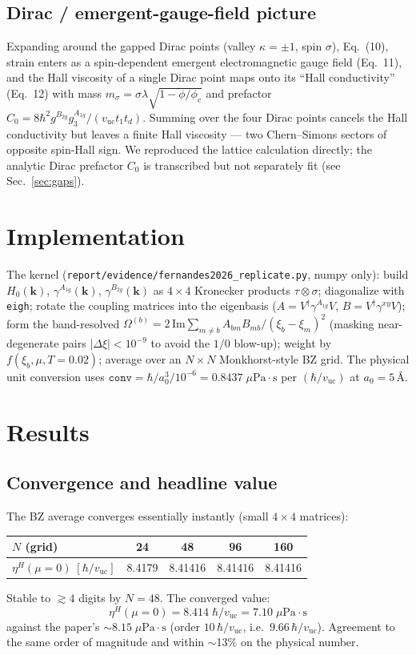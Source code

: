 \documentclass[11pt,a4paper]{article}
\newcommand{\vuc}{v_{\mathrm{uc}}}
\newcommand{\etaH}{\eta^{H}}
\begin{document}
\subsection{Dirac / emergent-gauge-field picture}
Expanding around the gapped Dirac points (valley $\kappa=\pm1$, spin
$\sigma$), Eq.~(10), strain enters as a spin-dependent emergent electromagnetic
gauge field (Eq.~11), and the Hall viscosity of a single Dirac point maps onto its
``Hall conductivity'' (Eq.~12) with mass $m_\sigma=\sigma\lambda\sqrt{1-\phi/\phi_c}$
and prefactor $C_0=8\hbar^2 g^{B_{2g}} g_3^{A_{1g}}/(\vuc t_1 t_d)$. Summing over the
four Dirac points cancels the Hall conductivity but leaves a finite Hall viscosity
--- two Chern--Simons sectors of opposite spin-Hall sign. We reproduced the
lattice calculation directly; the analytic Dirac prefactor $C_0$ is transcribed
but not separately fit (see Sec.~\ref{sec:gaps}).

\section{Implementation}
The kernel (\texttt{report/evidence/fernandes2026\_replicate.py}, numpy only):
build $H_0(\bm{k})$, $\gamma^{A_{1g}}(\bm{k})$, $\gamma^{B_{2g}}(\bm{k})$ as $4\times4$
Kronecker products $\tau\otimes\sigma$; diagonalize with \texttt{eigh}; rotate the
coupling matrices into the eigenbasis ($A=V^\dagger\gamma^{A_{1g}}V$,
$B=V^\dagger\gamma^{xy}V$); form the band-resolved
$\Omega^{(b)}=2\,\mathrm{Im}\sum_{m\neq b}A_{bm}B_{mb}/(\xi_b-\xi_m)^2$ (masking
near-degenerate pairs $|\Delta\xi|<10^{-9}$ to avoid the $1/0$ blow-up);
weight by $f(\xi_b,\mu,T{=}0.02)$; average over an $N\times N$ Monkhorst-style
BZ grid. The physical unit conversion uses
$\texttt{conv} = \hbar/a_0^3/10^{-6} = 0.8437\;\mu\text{Pa}\cdot\text{s}$ per
$(\hbar/\vuc)$ at $a_0=5\,\text{\AA}$.

\section{Results}
\subsection{Convergence and headline value}
The BZ average converges essentially instantly (small $4\times4$ matrices):
\begin{center}
\begin{tabular}{lcccc}
\toprule
$N$ (grid) & 24 & 48 & 96 & 160 \\
\midrule
$\etaH(\mu{=}0)\;[\hbar/\vuc]$ & 8.4179 & 8.41416 & 8.41416 & 8.41416 \\
\bottomrule
\end{tabular}
\end{center}
Stable to $\gtrsim4$ digits by $N=48$. The converged value:
\begin{equation}
\boxed{\;\etaH(\mu=0) = 8.414\;\hbar/\vuc = 7.10\;\mu\text{Pa}\cdot\text{s}\;}
\end{equation}
against the paper's $\sim 8.15\;\mu\text{Pa}\cdot\text{s}$ (order $10\,\hbar/\vuc$,
i.e.\ $9.66\,\hbar/\vuc$). Agreement to the same order of magnitude and within
$\sim$13\% on the physical number.
\end{document}
